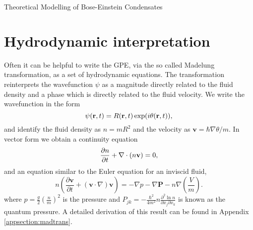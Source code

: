 \begin{chapter}{\label{cha:theoretical_model}Theoretical Modelling of Bose-Einstein Condensates}
\section{\label{section:hydrodynamic} Hydrodynamic interpretation}
	Often it can be helpful to write the GPE, via the so called Madelung transformation, as a set of hydrodynamic equations. The transformation reinterprets the wavefunction $\psi$ as a magnitude directly related to the fluid density and a phase which is directly related to the fluid velocity. We write the wavefunction in the form
	\begin{equation}
		\psi({\bf r},t) = R({\bf r},t)\exp (i\theta({\bf r},t)),
	\end{equation}
	 and identify the fluid density as $n=mR^2$ and the velocity as $\mathbf{v} = \hbar\nabla\theta/m $.
	In vector form we obtain a continuity equation
	\begin{equation}
	  \frac{\partial n}{\partial t} + \nabla\cdot(n{\bf v}) = 0,
	  \label{eq:MTcont}
	\end{equation}
	and an equation similar to the Euler equation for an inviscid fluid,
	\begin{equation}
	n\left( \frac{\partial \mathbf{v}}{\partial t} + \left( \mathbf{v} \cdot \nabla \right)\mathbf{v} \right) = -\nabla p - \nabla \mathbf{P} - n \nabla \left(\frac{V}{m}\right).
	\end{equation}
	where $p = \frac{g}{2}(\frac{n}{m})^2$ is the pressure and $P_{jk} = -\frac{\hbar^2}{4m^2}n\frac{\partial^2\ln{n}}{\partial x_j \partial x_k}$ is known as the quantum pressure.
	A detailed derivation of this result can be found in Appendix \ref{appsection:madtrans}.


\end{chapter}
